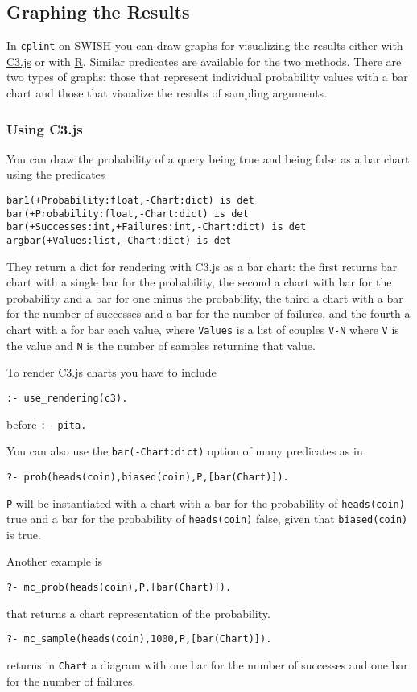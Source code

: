 \subsection{Graphing the Results}
\label{graphing}

In \texttt{cplint} on SWISH you can draw graphs
for visualizing the results either with \href{http://www.c3js.org/}{C3.js} or with \href{https://www.r-project.org/}{R}. Similar predicates are available for the two methods.
 There are two types
of graphs: those that represent individual probability values with a bar chart and those that
visualize the results of sampling arguments.

\subsubsection{Using C3.js}
You can draw the probability of a query being true and
being false as a bar chart using the predicates
\begin{verbatim}
bar1(+Probability:float,-Chart:dict) is det
bar(+Probability:float,-Chart:dict) is det
bar(+Successes:int,+Failures:int,-Chart:dict) is det
argbar(+Values:list,-Chart:dict) is det
\end{verbatim}
They return  a dict for rendering with C3.js as a bar chart:
the first  returns bar chart with
a single bar for the probability,  the second a chart with
bar for the probability and a bar for one minus the probability,
the third a  chart with
a bar for the number of successes and a bar for the number of failures, and
the fourth a  chart with
a for bar each value, where \verb|Values| is a list of couples \verb|V-N| where
  \verb|V| is the value and \verb|N| is the number of samples
  returning that value.
 
To render C3.js charts  you have to include
\begin{verbatim}
:- use_rendering(c3).
\end{verbatim}
before \verb|:- pita.| 

You can also use the  \verb|bar(-Chart:dict)| option of many predicates
as in
\begin{verbatim}
?- prob(heads(coin),biased(coin),P,[bar(Chart)]).
\end{verbatim}
\verb|P| will be instantiated with a
 chart with
a bar for the probability of \verb|heads(coin)| true and a bar for the probability of \verb|heads(coin)| false,
given that \verb|biased(coin)| is true.

Another example is
\begin{verbatim}
?- mc_prob(heads(coin),P,[bar(Chart)]).
\end{verbatim}
that returns a chart representation of the probability.
\begin{verbatim}
?- mc_sample(heads(coin),1000,P,[bar(Chart)]).
\end{verbatim}
returns in \verb|Chart| a diagram with one bar for the number of successes and
one bar for the number of failures.

